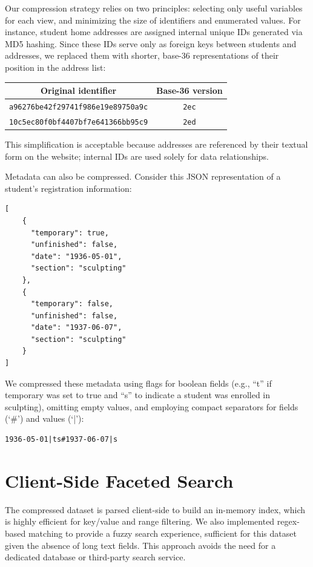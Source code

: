 \documentclass[final]{anthology-ch} %
\begin{document}
Our compression strategy relies on two principles: selecting only useful variables for each view, and minimizing the size of identifiers and enumerated values. For instance, student home addresses are assigned internal unique IDs generated via MD5 hashing. Since these IDs serve only as foreign keys between students and addresses, we replaced them with shorter, base-36 representations of their position in the address list:

\begin{center}
\begin{tabular}{c c}
 Original identifier&Base-36 version\\
 \hline
 \texttt{a96276be42f29741f986e19e89750a9c} & \texttt{2ec}\\

  \texttt{10c5ec80f0bf4407bf7e641366bb95c9} & \texttt{2ed}\\
 \hline
\end{tabular}
\end{center}

This simplification is acceptable because addresses are referenced by their textual form on the website; internal IDs are used solely for data relationships.

Metadata can also be compressed. Consider this JSON representation of a student’s registration information:
\begin{verbatim}
[
    {
      "temporary": true,
      "unfinished": false,
      "date": "1936-05-01",
      "section": "sculpting"
    },
    {
      "temporary": false,
      "unfinished": false,
      "date": "1937-06-07",
      "section": "sculpting"
    }
]
\end{verbatim}
We compressed these metadata using flags for boolean fields (e.g., “t” if temporary was set to true and “s” to indicate a student was enrolled in sculpting), omitting empty values, and employing compact separators for fields (‘\#’) and values (‘|’):
\begin{verbatim}
1936-05-01|ts#1937-06-07|s
\end{verbatim}

\section{Client-Side Faceted Search}
The compressed dataset is parsed client-side to build an in-memory index, which is highly efficient for key/value and range filtering. We also implemented regex-based matching to provide a fuzzy search experience, sufficient for this dataset given the absence of long text fields. This approach avoids the need for a dedicated database or third-party search service.
\end{document}
